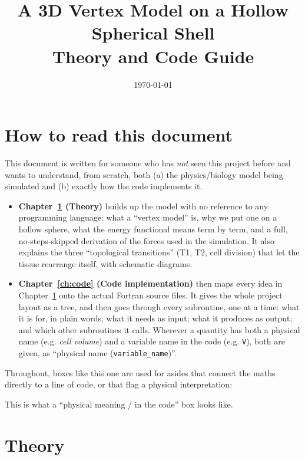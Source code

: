 \documentclass[11pt,a4paper]{report}
\title{\Huge \textbf{A 3D Vertex Model on a Hollow Spherical Shell}\\[6pt]
\Large Theory and Code Guide}
\author{}
\date{\today}
\begin{document}
\sloppy

\maketitle
\tableofcontents

\chapter*{How to read this document}

This document is written for someone who has \emph{not} seen this project
before and wants to understand, from scratch, both (a) the physics/biology
model being simulated and (b) exactly how the code implements it.

\begin{itemize}
  \item \textbf{Chapter~\ref{ch:theory} (Theory)} builds up the model with
  no reference to any programming language: what a ``vertex model'' is,
  why we put one on a hollow sphere, what the energy functional means
  term by term, and a full, no-steps-skipped derivation of the forces
  used in the simulation. It also explains the three ``topological
  transitions'' (T1, T2, cell division) that let the tissue rearrange
  itself, with schematic diagrams.
  \item \textbf{Chapter~\ref{ch:code} (Code implementation)} then maps
  every idea in Chapter~\ref{ch:theory} onto the actual Fortran source
  files. It gives the whole project layout as a tree, and then goes
  through every subroutine, one at a time: what it is for, in plain
  words; what it needs as input; what it produces as output; and which
  other subroutines it calls. Wherever a quantity has both a physical
  name (e.g. \emph{cell volume}) and a variable name in the code (e.g.
  \texttt{V}), both are given, as ``physical name (\texttt{variable\_name})''.
\end{itemize}

Throughout, boxes like this one are used for asides that connect the
maths directly to a line of code, or that flag a physical interpretation:

\begin{physbox}
This is what a ``physical meaning / in the code'' box looks like.
\end{physbox}

\chapter{Theory}
\label{ch:theory}
\end{document}
